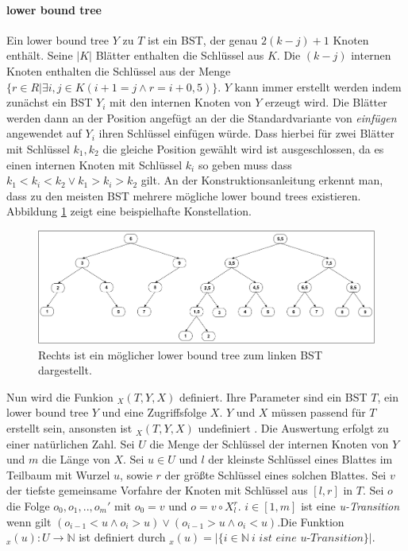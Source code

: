 \documentclass[a4paper,12pt]{article}
\begin{document}
\paragraph{lower bound tree}
Ein lower bound tree $Y$ zu $T$ ist ein BST, der genau $2 \left(k - j \right) + 1$ Knoten enthält. Seine $\vert K \vert$ Blätter enthalten die Schlüssel aus $K$. Die $\left(k - j \right)$ internen Knoten enthalten die Schlüssel aus der Menge $\{r \in R \vert \exists i,j \in K \left( i + 1 = j \land r = i + 0,5\right)\}$. $Y$ kann immer erstellt werden indem zunächst ein BST $Y_i$ mit den internen Knoten von $Y$ erzeugt wird. Die Blätter werden dann an der Position angefügt an der die Standardvariante von \textit{einfügen} angewendet auf $Y_i$ ihren Schlüssel einfügen würde. Dass hierbei für zwei Blätter mit Schlüssel $k_1, k_2$ die gleiche Position gewählt wird ist ausgeschlossen, da es einen internen Knoten mit Schlüssel $k_i$ so geben muss dass $k_1 < k_i < k_2 \lor k_1 > k_i > k_2 $ gilt. An der Konstruktionsanleitung erkennt man, dass zu den meisten BST mehrere mögliche lower bound trees existieren. Abbildung \ref{fig:lowerBoundTree} zeigt eine beispielhafte Konstellation. \\


        
\begin{figure}[h]
	\centering
	\includegraphics[width=1\textwidth]{"Medien/DynOpt/lowerBoundTree"}
	\caption{Rechts ist ein möglicher lower bound tree zum linken BST dargestellt.  }
	\label{fig:lowerBoundTree}
\end{figure}

\noindent Nun wird die Funkion $_X(T, Y, X) $ definiert. Ihre Parameter sind ein BST $T$, ein lower bound tree $Y$ und eine Zugriffsfolge $X$. $Y$ und $X$ müssen passend für $T$ erstellt sein, ansonsten ist $_X(T, Y, X) $ undefiniert . Die Auswertung erfolgt zu einer natürlichen Zahl. Sei $U$ die Menge der Schlüssel der internen Knoten von $Y$ und $m$ die Länge von $X$. Sei $u \in U$ und $l$ der kleinste Schlüssel eines Blattes im Teilbaum mit Wurzel $u$, sowie $r$ der größte Schlüssel eines solchen Blattes. Sei $v$ der tiefste gemeinsame Vorfahre der Knoten mit Schlüssel aus $\left[l, r\right]$  in $T$. Sei $o$ die Folge $o_0, o_1,..,o_m'$ mit $o_0 = v$ und $o = v \circ X^r_l$. $i \in \left[1,m\right]$ ist eine \textit{u-Transition} wenn gilt $\left( o_{i-1} < u \land o_i > u \right) \lor \left( o_{i-1} > u \land o_i < u \right)$.Die Funktion $_x (u) \colon U \rightarrow \mathbb{N}$ ist definiert durch $_x(u) = \vert\{i \in \mathbb{N}\ \textit{i ist eine u-Transition}\} \vert$.
\end{document}
